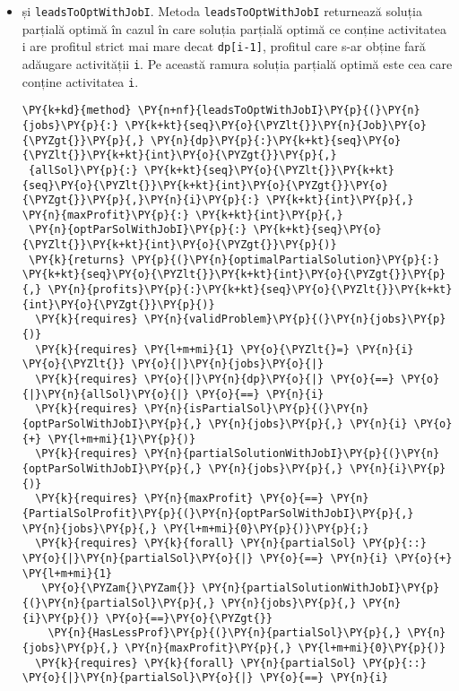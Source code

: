 \begin{itemize}
    
    \item și \texttt{leadsToOptWithJobI}. Metoda \texttt{leadsToOptWithJobI} returnează soluția parțială optimă în cazul în care soluția parțială optimă ce conține activitatea i
    are profitul strict mai mare decat \texttt{dp[i-1]}, profitul care s-ar obține fară adăugare activității \texttt{i}. Pe această ramura soluția parțială optimă este cea care conține activitatea \texttt{i}.
\begin{Verbatim}[commandchars=\\\{\}, fontsize=\footnotesize]
\PY{k+kd}{method} \PY{n+nf}{leadsToOptWithJobI}\PY{p}{(}\PY{n}{jobs}\PY{p}{:} \PY{k+kt}{seq}\PY{o}{\PYZlt{}}\PY{n}{Job}\PY{o}{\PYZgt{}}\PY{p}{,} \PY{n}{dp}\PY{p}{:}\PY{k+kt}{seq}\PY{o}{\PYZlt{}}\PY{k+kt}{int}\PY{o}{\PYZgt{}}\PY{p}{,}
 {allSol}\PY{p}{:} \PY{k+kt}{seq}\PY{o}{\PYZlt{}}\PY{k+kt}{seq}\PY{o}{\PYZlt{}}\PY{k+kt}{int}\PY{o}{\PYZgt{}}\PY{o}{\PYZgt{}}\PY{p}{,}\PY{n}{i}\PY{p}{:} \PY{k+kt}{int}\PY{p}{,} \PY{n}{maxProfit}\PY{p}{:} \PY{k+kt}{int}\PY{p}{,} 
 \PY{n}{optParSolWithJobI}\PY{p}{:} \PY{k+kt}{seq}\PY{o}{\PYZlt{}}\PY{k+kt}{int}\PY{o}{\PYZgt{}}\PY{p}{)} 
 \PY{k}{returns} \PY{p}{(}\PY{n}{optimalPartialSolution}\PY{p}{:} \PY{k+kt}{seq}\PY{o}{\PYZlt{}}\PY{k+kt}{int}\PY{o}{\PYZgt{}}\PY{p}{,} \PY{n}{profits}\PY{p}{:}\PY{k+kt}{seq}\PY{o}{\PYZlt{}}\PY{k+kt}{int}\PY{o}{\PYZgt{}}\PY{p}{)}
  \PY{k}{requires} \PY{n}{validProblem}\PY{p}{(}\PY{n}{jobs}\PY{p}{)}
  \PY{k}{requires} \PY{l+m+mi}{1} \PY{o}{\PYZlt{}=} \PY{n}{i} \PY{o}{\PYZlt{}} \PY{o}{|}\PY{n}{jobs}\PY{o}{|}
  \PY{k}{requires} \PY{o}{|}\PY{n}{dp}\PY{o}{|} \PY{o}{==} \PY{o}{|}\PY{n}{allSol}\PY{o}{|} \PY{o}{==} \PY{n}{i}
  \PY{k}{requires} \PY{n}{isPartialSol}\PY{p}{(}\PY{n}{optParSolWithJobI}\PY{p}{,} \PY{n}{jobs}\PY{p}{,} \PY{n}{i} \PY{o}{+} \PY{l+m+mi}{1}\PY{p}{)}
  \PY{k}{requires} \PY{n}{partialSolutionWithJobI}\PY{p}{(}\PY{n}{optParSolWithJobI}\PY{p}{,} \PY{n}{jobs}\PY{p}{,} \PY{n}{i}\PY{p}{)}
  \PY{k}{requires} \PY{n}{maxProfit} \PY{o}{==} \PY{n}{PartialSolProfit}\PY{p}{(}\PY{n}{optParSolWithJobI}\PY{p}{,} \PY{n}{jobs}\PY{p}{,} \PY{l+m+mi}{0}\PY{p}{)}\PY{p}{;}
  \PY{k}{requires} \PY{k}{forall} \PY{n}{partialSol} \PY{p}{::} \PY{o}{|}\PY{n}{partialSol}\PY{o}{|} \PY{o}{==} \PY{n}{i} \PY{o}{+} \PY{l+m+mi}{1} 
   \PY{o}{\PYZam{}\PYZam{}} \PY{n}{partialSolutionWithJobI}\PY{p}{(}\PY{n}{partialSol}\PY{p}{,} \PY{n}{jobs}\PY{p}{,} \PY{n}{i}\PY{p}{)} \PY{o}{==}\PY{o}{\PYZgt{}} 
    \PY{n}{HasLessProf}\PY{p}{(}\PY{n}{partialSol}\PY{p}{,} \PY{n}{jobs}\PY{p}{,} \PY{n}{maxProfit}\PY{p}{,} \PY{l+m+mi}{0}\PY{p}{)}
  \PY{k}{requires} \PY{k}{forall} \PY{n}{partialSol} \PY{p}{::} \PY{o}{|}\PY{n}{partialSol}\PY{o}{|} \PY{o}{==} \PY{n}{i}

\end{Verbatim}
\end{itemize}

